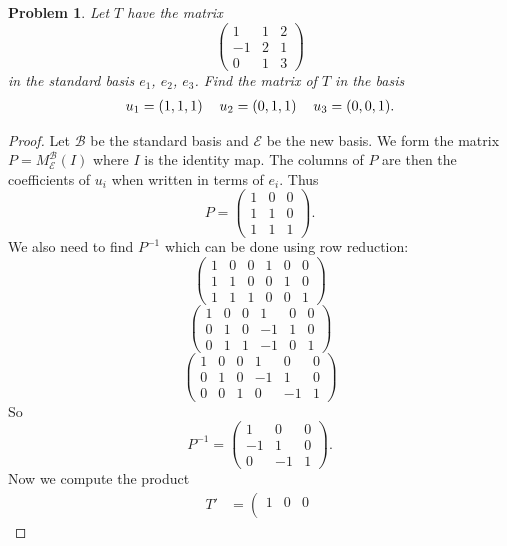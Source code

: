 \documentclass{article}
\newtheorem{problem}{Problem}
\begin{document}
\begin{problem}
Let $T$ have the matrix
\[
\left (
\begin{array}{ccc}
1 & 1 & 2\\
-1 & 2 & 1\\
0 & 1 & 3
\end{array}
\right )
\]
in the standard basis $e_1$, $e_2$, $e_3$. Find the matrix of $T$ in the basis 
\[
\begin{tabular}{ccc}
$u_1 = (1,1,1)$ & $u_2 = (0,1,1)$ & $u_3 = (0,0,1)$.
\end{tabular}
\]
\end{problem}
\begin{proof}
Let $\mathcal{B}$ be the standard basis and $\mathcal{E}$ be the new basis. We form the matrix $P = M_{\mathcal{E}}^{\mathcal{B}}(I)$ where $I$ is the identity map. The columns of $P$ are then the coefficients of $u_i$ when written in terms of $e_i$. Thus
\[
P =
\left (
\begin{array}{ccc}
1 & 0 & 0\\
1 & 1 & 0\\
1 & 1 & 1
\end{array}
\right ).
\]
We also need to find $P^{-1}$ which can be done using row reduction:
\[
\left (
\begin{array}{ccc|ccc}
1 & 0 & 0 & 1 & 0 & 0\\
1 & 1 & 0 & 0 & 1 & 0\\
1 & 1 & 1 & 0 & 0 & 1
\end{array}
\right )
\]
\[
\left (
\begin{array}{ccc|ccc}
1 & 0 & 0 & 1 & 0 & 0\\
0 & 1 & 0 & -1 & 1 & 0\\
0 & 1 & 1 & -1 & 0 & 1
\end{array}
\right )
\]
\[
\left (
\begin{array}{ccc|ccc}
1 & 0 & 0 & 1 & 0 & 0\\
0 & 1 & 0 & -1 & 1 & 0\\
0 & 0 & 1 & 0 & -1 & 1
\end{array}
\right )
\]
So
\[
P^{-1} =
\left (
\begin{array}{ccc}
1 & 0 & 0\\
-1 & 1 & 0\\
0 & -1 & 1
\end{array}
\right ).
\]
Now we compute the product
\begin{align*}
T'
&=
\left (
\begin{array}{ccc}
1 & 0 & 0\\

\end{array}
\end{align*}
\end{proof}
\end{document}

